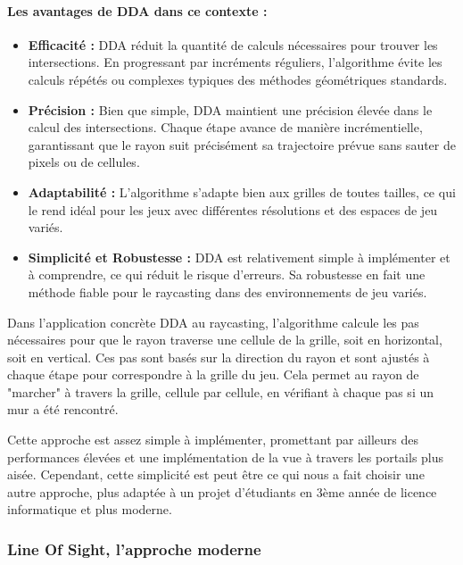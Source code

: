 \documentclass[11pt]{article}
\begin{document}
\paragraph{Les avantages de DDA dans ce contexte :}
\begin{itemize}
\item \textbf{Efficacité :} DDA réduit la quantité de calculs nécessaires pour trouver les intersections. En progressant par 
incréments réguliers, l'algorithme évite les calculs répétés ou complexes typiques des méthodes géométriques standards.
\item \textbf{Précision :} Bien que simple, DDA maintient une précision élevée dans le calcul des intersections. Chaque étape 
avance de manière incrémentielle, garantissant que le rayon suit précisément sa trajectoire prévue sans sauter de pixels ou de cellules.
\item \textbf{Adaptabilité :} L'algorithme s'adapte bien aux grilles de toutes tailles, ce qui le rend idéal pour les jeux avec 
différentes résolutions et des espaces de jeu variés.
\item \textbf{Simplicité et Robustesse :} DDA est relativement simple à implémenter et à comprendre, ce qui réduit le risque 
d'erreurs. Sa robustesse en fait une méthode fiable pour le raycasting dans des environnements de jeu variés.
\end{itemize}

Dans l'application concrète DDA au raycasting, l'algorithme calcule les pas nécessaires pour que le rayon 
traverse une cellule de la grille, soit en horizontal, soit en vertical. Ces pas sont basés sur la direction du 
rayon et sont ajustés à chaque étape pour correspondre à la grille du jeu. Cela permet au rayon de "marcher" à travers 
la grille, cellule par cellule, en vérifiant à chaque pas si un mur a été rencontré.

\noindent Cette approche est assez simple à implémenter, promettant par ailleurs des performances élevées et 
une implémentation de la vue à travers les portails plus aisée. Cependant, cette simplicité est peut être ce qui 
nous a fait choisir une autre approche, plus adaptée à un projet d'étudiants en 3ème année de licence informatique et plus moderne.
 
\subsubsection{Line Of Sight, l'approche moderne}
\end{document}
